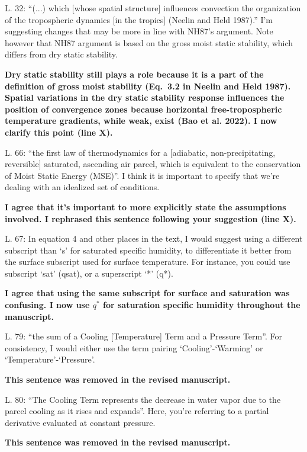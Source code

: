 \documentclass{article}
\begin{document}
\par
L. 32: ``(...) which [whose spatial structure] influences convection the organization of the tropospheric dynamics [in the tropics] (Neelin and Held 1987).'' I'm suggesting changes that may be more in line with NH87's argument. Note however that NH87 argument is based on the gross moist static stability, which differs from dry static stability.
\par
\textbf{Dry static stability still plays a role because it is a part of the definition of gross moist stability (Eq.~3.2 in Neelin and Held 1987). Spatial variations in the dry static stability response influences the position of convergence zones because horizontal free-tropospheric temperature gradients, while weak, exist (Bao et al. 2022). I now clarify this point (line X).}
\par
L. 66: ``the first law of thermodynamics for a [adiabatic, non-precipitating, reversible] saturated, ascending air parcel, which is equivalent to the conservation of Moist Static Energy (MSE)''. I think it is important to specify that we're dealing with an idealized set of conditions.
\par
\textbf{I agree that it's important to more explicitly state the assumptions involved. I rephrased this sentence following your suggestion (line X).}
\par
L. 67: In equation 4 and other places in the text, I would suggest using a different subscript than `s' for saturated specific humidity, to differentiate it better from the surface subscript used for surface temperature. For instance, you could use subscript `sat' (qsat), or a superscript `*' (q*).
\par
\textbf{I agree that using the same subscript for surface and saturation was confusing. I now use $q^*$ for saturation specific humidity throughout the manuscript.}
\par
L. 79: ``the sum of a Cooling [Temperature] Term and a Pressure Term''. For consistency, I would either use the term pairing `Cooling'-`Warming' or `Temperature'-`Pressure'.
\par
\textbf{This sentence was removed in the revised manuscript.}
\par
L. 80: ``The Cooling Term represents the decrease in water vapor due to the parcel cooling as it rises and expands''. Here, you're referring to a partial derivative evaluated at constant pressure.
\par
\textbf{This sentence was removed in the revised manuscript.}
\par
\end{document}
